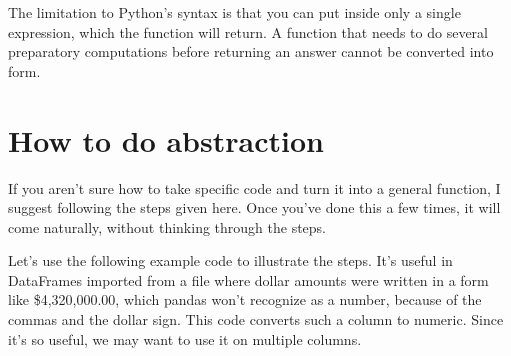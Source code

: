 \documentclass[letterpaper,10pt,english]{jupyterBook}
\begin{document}
\sphinxAtStartPar
The limitation to Python’s  syntax is that you can put inside only a single expression, which the function will return.  A function that needs to do several preparatory computations before returning an answer cannot be converted into  form.


\section{How to do abstraction}
\label{\detokenize{chapter-7-abstraction:how-to-do-abstraction}}
\sphinxAtStartPar
If you aren’t sure how to take specific code and turn it into a general function, I suggest following the steps given here.  Once you’ve done this a few times, it will come naturally, without thinking through the steps.

\sphinxAtStartPar
Let’s use the following example code to illustrate the steps.  It’s useful in DataFrames imported from a file where dollar amounts were written in a form like \$4,320,000.00, which pandas won’t recognize as a number, because of the commas and the dollar sign.  This code converts such a column to numeric.  Since it’s so useful, we may want to use it on multiple columns.

\begin{sphinxVerbatim}[commandchars=\\\{\}]
\PYG{p}{[}\PYG{p}{]}  \PYG{p}{[}\PYG{p}{]}    
\PYG{p}{[}\PYG{p}{]}  \PYG{p}{[}\PYG{p}{]}    
\PYG{p}{[}\PYG{p}{]}  \PYG{p}{[}\PYG{p}{]}          
\end{sphinxVerbatim}
\end{document}
